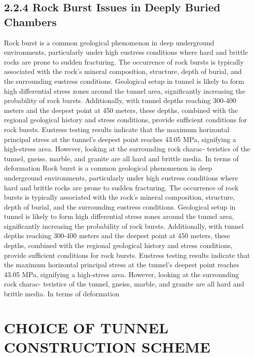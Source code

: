 \documentclass[11pt]{article}
\newcommand{\sectiontitle}[1]{\noindent\textbf{\MakeUppercase{#1}}}
\newcommand{\firstletter}[1]{\textbf{\fontsize{14}{17}\selectfont #1}}
\begin{document}
\subsection*{2.2.4 Rock Burst Issues in Deeply Buried Chambers}

Rock burst is a common geological phenomenon in deep underground environments, particularly under high eustress conditions where hard and brittle rocks are prone to sudden fracturing. The occurrence of rock bursts is typically associated with the rock’s mineral composition, structure, depth of burial, and the surrounding eustress conditions. Geological setup in tunnel is likely to form high differential stress zones around the tunnel area, significantly increasing the probability of rock bursts. Additionally, with tunnel depths reaching 300-400 meters and the deepest point at 450 meters, these depths, combined with the regional geological history and stress conditions, provide sufficient conditions for rock bursts.
Eustress testing results indicate that the maximum horizontal principal stress at the tunnel’s deepest point reaches 43.05 MPa, signifying a high-stress area. However, looking at the surrounding rock charac- teristics of the tunnel, gneiss, marble, and granite are all hard and brittle media. In terms of deformation Rock burst is a common geological phenomenon in deep underground environments, particularly under high eustress conditions where hard and brittle rocks are prone to sudden fracturing. The occurrence of rock bursts is typically associated with the rock’s mineral composition, structure, depth of burial, and the surrounding eustress conditions. Geological setup in tunnel is likely to form high differential stress zones around the tunnel area, significantly increasing the probability of rock bursts. Additionally, with tunnel depths reaching 300-400 meters and the deepest point at 450 meters, these depths, combined with the regional geological history and stress conditions, provide sufficient conditions for rock bursts.
Eustress testing results indicate that the maximum horizontal principal stress at the tunnel’s deepest point reaches 43.05 MPa, signifying a high-stress area. However, looking at the surrounding rock charac- teristics of the tunnel, gneiss, marble, and granite are all hard and brittle media. In terms of deformation



\section*{\sectiontitle{\firstletter{3} \hspace{0.1cm} \firstletter{C}hoice of \firstletter{T}unnel \firstletter{C}onstruction \firstletter{S}cheme}}
\end{document}
